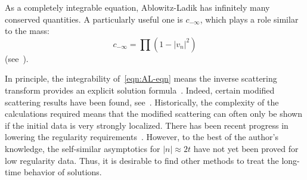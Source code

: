 \documentclass[letterpaper, reqno,final]{amsart}
\begin{document}
As a completely integrable equation, Ablowitz-Ladik has infinitely many conserved quantities.  A particularly useful one is $c_{-\infty}$, which plays a role similar to the mass:
\begin{equation}
    c_{-\infty} = \prod (1 - |v_n|^2)
\end{equation}
(see~\cite{ablowitzDiscreteContinuousNonlinear2004}).  

In principle, the integrability of~\eqref{eqn:AL-eqn} means the inverse scattering transform provides an explicit solution formula~\cite{ablowitzDiscreteContinuousNonlinear2004}.  Indeed, certain modified scattering results have been found, see~\cite{yamaneLongtimeAsymptoticsIntegrable2019,yamaneLongtimeAsymptoticsDefocusing2014,yamaneLongTimeAsymptoticsDefocusing2015,chenLongTimeAsymptoticBehavior2020,meisenLongtimeAsymptoticAnalysis2022a}.	Historically, the complexity of the calculations required means that the modified scattering can often only be shown if the initial data is very strongly localized.  There has been recent progress in lowering the regularity requirements~\cite{chenL2SobolevSpaceBijectivity2023,meisenLongtimeAsymptoticAnalysis2022a}.  However, to the best of the author's knowledge, the self-similar asymptotics for $|n| \approx 2t$ have not yet been proved for low regularity data.  Thus, it is desirable to find other methods to treat the long-time behavior of solutions.
\end{document}
